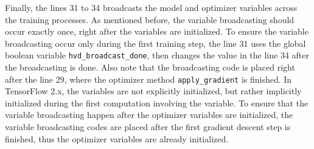 Finally, the lines 31 to 34 broadcasts the model and optimizer variables
across the training processes.
As mentioned before, the variable broadcasting should occur exactly once,
right after the variables are initialized.
To ensure the variable broadcasting occur only during the first training step,
the line 31 uses the global boolean variable {\tt hvd\_broadcast\_done},
then changes the value in the line 34 after the broadcasting is done.
Also note that the broadcasting code is placed right after the line 29,
where the optimizer method {\tt apply\_gradient} is finished.
In TensorFlow 2.x, the variables are not explicitly initialized,
but rather implicitly initialized during the first computation involving the
variable.
To ensure that the variable broadcasting happen after the optimizer
variables are initialized, the variable broadcasting codes are placed
after the first gradient descent step is finished, thus the optimizer
variables are already initialized.
